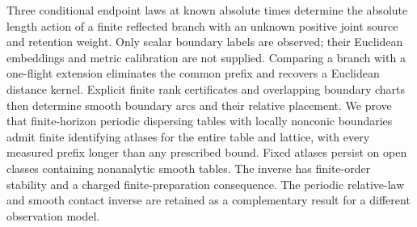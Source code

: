 Three conditional endpoint laws at known absolute times determine the
absolute length action of a finite reflected branch with an unknown
positive joint source and retention weight.  Only scalar boundary labels
are observed; their Euclidean embeddings and metric calibration are not
supplied.  Comparing a branch with a one-flight extension eliminates the
common prefix and recovers a Euclidean distance kernel.  Explicit finite
rank certificates and overlapping boundary charts then determine smooth
boundary arcs and their relative placement.  We prove that finite-horizon
periodic dispersing tables with locally nonconic boundaries admit finite
identifying atlases for the entire table and lattice, with every measured
prefix longer than any prescribed bound.  Fixed atlases persist on open
classes containing nonanalytic smooth tables.  The inverse has finite-order
stability and a charged finite-preparation consequence.  The periodic
relative-law and smooth contact inverse are retained as a complementary
result for a different observation model.
